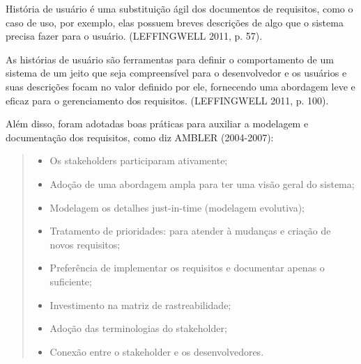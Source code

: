 História de usuário é uma substituição ágil dos documentos de requisitos, como o caso de uso, por exemplo, elas possuem breves descrições de algo que o sistema precisa fazer para o usuário.  (LEFFINGWELL 2011, p. 57).

As histórias de usuário são ferramentas para definir o comportamento de um sistema de um jeito que seja compreensível para o desenvolvedor e os usuários e suas descrições focam no valor definido por ele, fornecendo uma abordagem leve e eficaz para o gerenciamento dos requisitos. (LEFFINGWELL 2011, p. 100).

Além disso, foram adotadas boas práticas para auxiliar a modelagem e documentação dos requisitos, como diz AMBLER (2004-2007):
\begin{quote} 
    \begin{itemize}
        \item Os stakeholders participaram ativamente;
        \item Adoção de uma abordagem ampla para ter uma visão geral do sistema;
        \item Modelagem os detalhes just-in-time (modelagem evolutiva);
        \item Tratamento de prioridades: para atender à mudanças e criação de novos requisitos;
        \item Preferência de implementar os requisitos e documentar apenas o suficiente;
        \item Investimento na matriz de rastreabilidade;
        \item Adoção das terminologias do stakeholder;
        \item Conexão entre o stakeholder e os desenvolvedores.
    \end{itemize}
\end{quote}